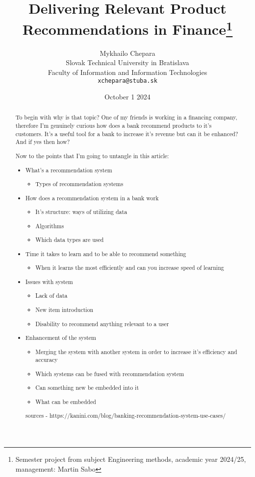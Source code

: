 \documentclass[10pt,twoside,english,a4paper]{article}
\title{Delivering Relevant Product Recommendations in Finance\thanks{Semester project from subject Engineering methods, academic year 2024/25, management: Martin Sabo}} %
\author{Mykhailo Chepara\\[2pt]
	{\small Slovak Technical University in Bratislava}\\
	{\small Faculty of Information and Information Technologies}\\
	{\small \texttt{xchepara@stuba.sk}}
	}
\date{\small October 1 2024} %
\begin{document}
\maketitle


\begin{abstract}
To begin with why is that topic? 
One of my friends is working in a financing company, therefore I'm genuinely curious how does a bank recommend products to it's customers. It's a useful tool for a bank to increase it's revenue but can it be enhanced? And if yes then how?

Now to the points that I'm going to untangle in this article:
\begin{itemize}
    \item What's a recommendation system
    \begin{itemize}
        \item Types of recommendation systems
    \end{itemize}
    
    \item How does a recommendation system in a bank work
    \begin{itemize} 
             \item It's structure: ways of utilizing data
             \item Algorithms
             \item Which data types are used
    \end{itemize}
    
    \item Time it takes to learn and to be able to recommend something
    \begin{itemize}
        \item When it learns the most efficiently and can you increase speed of learning
    \end{itemize}
    
    \item Issues with system
    \begin{itemize}
        \item Lack of data
        \item New item introduction
        \item Disability to recommend anything relevant to a user
    \end{itemize}
    
    \item Enhancement of the system
    \begin{itemize}
        \item Merging the system with another system in order to increase it's efficiency and accuracy
        \item Which systems can be fused with recommendation system
        \item Can something new be embedded into it
        \item What can be embedded
    
    \end{itemize}
    
sources - https://kanini.com/blog/banking-recommendation-system-use-cases/
\end{itemize}


\end{abstract}
\end{document}
